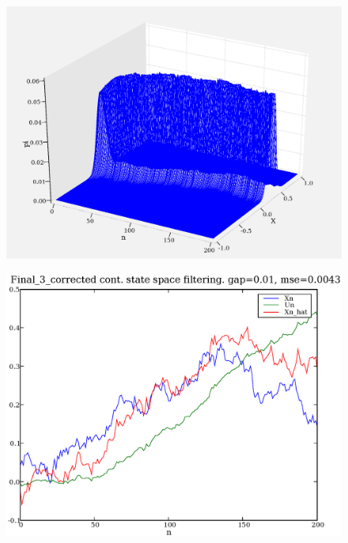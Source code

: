 \documentclass[a4paper,10pt]{article}
\begin{document}
\begin{figure}
\includegraphics[width=1\textwidth]{Final_3_3d_pi_FDF.eps}
\caption{}\label{f4}
\end{figure}

\begin{figure}
\includegraphics[width=1\textwidth]{Final_3_corrected_Xn_Un_Xn_hat_gap_0.01.eps}
\caption{}\label{f5}
\end{figure}
\end{document}
